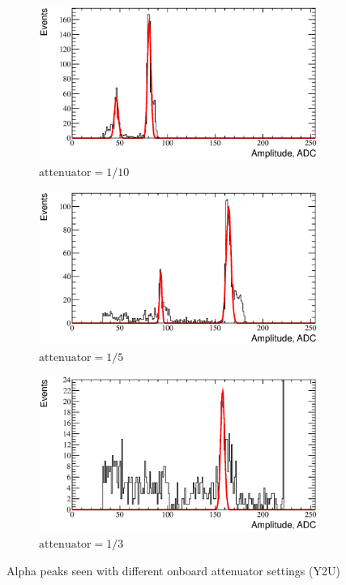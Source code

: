 \documentclass[a4paper]{article}
\begin{document}
\begin{figure}[p]
\begin{subfigure}[b]{0.3\textwidth}
\includegraphics[width=\textwidth]{gfx/atten_1_over_10_ch06.eps}
\caption{$\text{attenuator}=1/10$}
\end{subfigure}
\begin{subfigure}[b]{0.3\textwidth}
\includegraphics[width=\textwidth]{gfx/atten_1_over_5_ch06.eps}
\caption{$\text{attenuator}=1/5$}
\end{subfigure}
\begin{subfigure}[b]{0.3\textwidth}
\includegraphics[width=\textwidth]{gfx/atten_1_over_3_ch06.eps}
\caption{$\text{attenuator}=1/3$}
\end{subfigure}
\caption{Alpha peaks seen with different onboard attenuator settings (Y2U)}
\label{fig:atten_distrib}
\end{figure}
\end{document}
